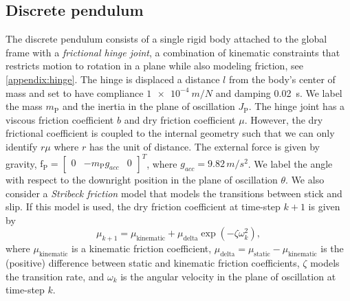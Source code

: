 \documentclass[preprint,12pt]{elsarticle}
\let\vec\bm
\numberwithin{equation}{section}
\def\tP{\text{P}}
\begin{document}
\subsection{Discrete pendulum}
The discrete pendulum consists of a single rigid body attached to the global frame with a \emph{frictional hinge joint}, a combination of kinematic constraints that restricts motion to rotation in a plane while also modeling friction, see \ref{appendix:hinge}.
The hinge is displaced a distance $l$ from the body's center of mass and set to have compliance $\SI{1e-4}{m/N}$ and damping \SI{0.02}{s}.
We label the mass $m_\tP$ and the inertia in the plane of oscillation $J_\tP$.
The hinge joint has a viscous friction coefficient $b$ and dry friction coefficient $\mu$. However, the dry frictional coefficient is coupled to the internal geometry such that we can only identify $r \mu$ where $r$ has the unit of distance.
The external force is given by gravity, $\vec{\mathrm{f}}_\tP = \begin{bmatrix} 0 & -m_\tP g_{acc} & 0 \end{bmatrix}^T$, where $g_{acc} = 9.82\,\si{m/s^2}$.
We label the angle with respect to the downright position in the plane of oscillation $\theta$.
We also consider a \emph{Stribeck friction} model that models the transitions between stick and slip.
If this model is used, the dry friction coefficient at time-step $k+1$ is given by
\begin{equation}
    \label{eq:stribeck}
    \mu_{k+1} = \mu_{\text{kinematic}} + \mu_{\text{delta}} \exp (-\zeta \omega_k^2),
\end{equation}
where $\mu_{\text{kinematic}}$ is a kinematic friction coefficient, $\mu_\text{delta} = \mu_\text{static} - \mu_\text{kinematic}$ is the (positive) difference between static and kinematic friction coefficients, $\zeta$ models the transition rate, and $\omega_k$ is the angular velocity in the plane of oscillation at time-step $k$.
\end{document}
